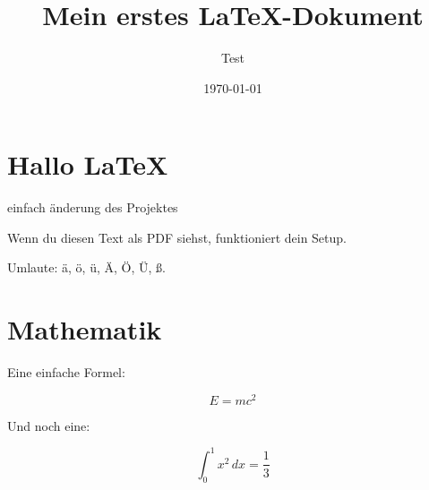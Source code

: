 \documentclass[a4paper,12pt]{article}
\title{Mein erstes LaTeX-Dokument}
\author{Test}
\date{\today}
\begin{document}
\maketitle

\section{Hallo LaTeX}

einfach änderung des Projektes

Wenn du diesen Text als PDF siehst, funktioniert dein Setup.

Umlaute: ä, ö, ü, Ä, Ö, Ü, ß.

\section{Mathematik}

Eine einfache Formel:

\[
E = mc^2
\]

Und noch eine:

\[
\int_0^1 x^2 \, dx = \frac{1}{3}
\]
\end{document}
